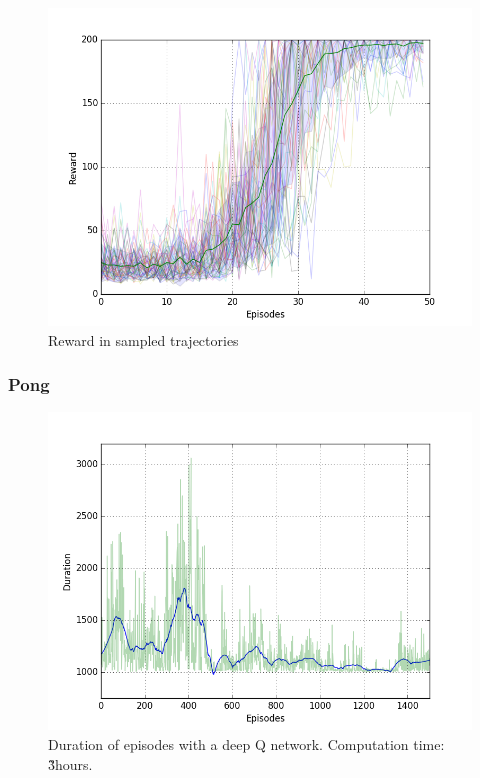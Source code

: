 \begin{figure}[!ht]
  \centering
  \includegraphics[width=1\textwidth]{./figures/cartpole_reward.png}
  \caption{Reward in sampled trajectories}
  \label{fig:cartpole_reward}
\end{figure}

\subsubsection{Pong}

\begin{figure}[!ht]
  \centering
  \includegraphics[width=1\textwidth]{./figures/deepq_relu_duration.png}
  \caption{Duration of episodes with a deep Q network. Computation time: \~3hours.}
  \label{fig:deepq_pong_duration}
\end{figure}

